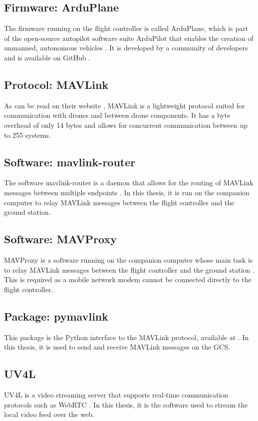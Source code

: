 \documentclass[nofilelist]{cslthse-msc}
\begin{document}
\subsection{Firmware: ArduPlane}
\label{sec:ardupilot}
The firmware running on the flight controller is called ArduPlane, which is part of the open-source autopilot software suite ArduPilot that enables the creation of unmanned, autonomous vehicles \cite{ardupilot-org}. It is developed by a community of developers and is available on GitHub \cite{ardupilot-github}.

\subsection{Protocol: MAVLink}
As can be read on their website \cite{mavlink}, MAVLink is a lightweight protocol suited for communication with drones and between drone components. It has a byte overhead of only 14 bytes and allows for concurrent communication between up to 255 systems. 

\subsection{Software: mavlink-router}
\label{sec:mavlink-router}
The software mavlink-router is a daemon that allows for the routing of MAVLink messages between multiple endpoints \cite{mavlink-router}. In this thesis, it is run on the companion computer to relay MAVLink messages between the flight controller and the ground station.

\subsection{Software: MAVProxy}
MAVProxy is a software running on the companion computer whose main task is to relay MAVLink messages between the flight controller and the ground station \cite{mavproxy}. This is required as a mobile network modem cannot be connected directly to the flight controller. 

\subsection{Package: pymavlink}
This package is the Python interface to the MAVLink protocol, available at \cite{pymavlink}. In this thesis, it is used to send and receive MAVLink messages on the GCS.

\subsection{UV4L}
UV4L is a video streaming server that supports real-time communication protocols such as WebRTC \cite{uv4l}. In this thesis, it is the software used to stream the local video feed over the web. 
\end{document}
